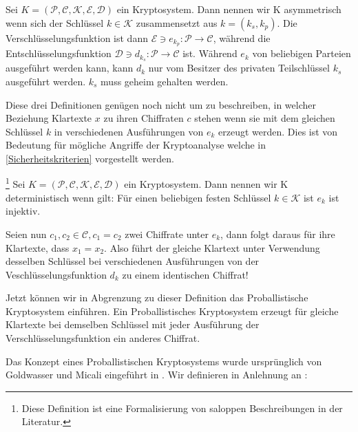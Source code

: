 \begin{theorem}
	Sei $K = (\mathcal{P},\mathcal{C},\mathcal{K},\mathcal{E},\mathcal{D})$ ein Kryptosystem. Dann nennen wir K asymmetrisch wenn sich der Schlüssel $k\in\mathcal{K}$ zusammensetzt aus $k=(k_s, k_p)$. Die Verschlüsselungsfunktion ist dann $\mathcal{E}\ni e_{k_p}:\mathcal{P}\rightarrow\mathcal{C}$, während die Entschlüsselungsfunktion $\mathcal{D}\ni d_{k_s}:\mathcal{P}\rightarrow\mathcal{C}$ ist. Während $e_k$ von beliebigen Parteien ausgeführt werden kann, kann $d_k$ nur vom Besitzer des privaten Teilschlüssel $k_s$ ausgeführt werden. $k_s$ muss geheim gehalten werden.
\end{theorem}

Diese drei Definitionen genügen noch nicht um zu beschreiben, in welcher Beziehung Klartexte $x$ zu ihren Chiffraten $c$ stehen wenn sie mit dem gleichen Schlüssel $k$ in verschiedenen Ausführungen von $e_k$ erzeugt werden. Dies ist von Bedeutung für mögliche Angriffe der Kryptoanalyse welche in \ref{Sicherheitskriterien} vorgestellt werden.

\begin{theorem}\footnote{Diese Definition ist eine Formalisierung von saloppen Beschreibungen in der Literatur.}
	Sei $K = (\mathcal{P},\mathcal{C},\mathcal{K},\mathcal{E},\mathcal{D})$ ein Kryptosystem. Dann nennen wir K deterministisch wenn gilt: Für einen beliebigen festen Schlüssel $k\in\mathcal{K}$ ist $e_k$ ist injektiv. %
\end{theorem}

Seien nun $c_1,c_2\in\mathcal{C}, c_1= c_2$ zwei Chiffrate unter $e_k$, dann folgt daraus für ihre Klartexte, dass $x_1= x_2$. Also führt der gleiche Klartext unter Verwendung desselben Schlüssel bei verschiedenen Ausführungen von der Veschlüsselungsfunktion $d_k$ zu einem identischen Chiffrat!

Jetzt können wir in Abgrenzung zu dieser Definition das Proballistische Kryptosystem einführen. Ein Proballistisches Kryptosystem erzeugt für gleiche Klartexte bei demselben Schlüssel mit jeder Ausführung der Verschlüsselungsfunktion ein
anderes Chiffrat.

Das Konzept eines Proballistischen Kryptosystems wurde ursprünglich von Goldwasser und Micali eingeführt in \cite{goldwasser1984probabilistic}. Wir definieren in Anlehnung an \cite[p.345]{delfs2002introduction}:

